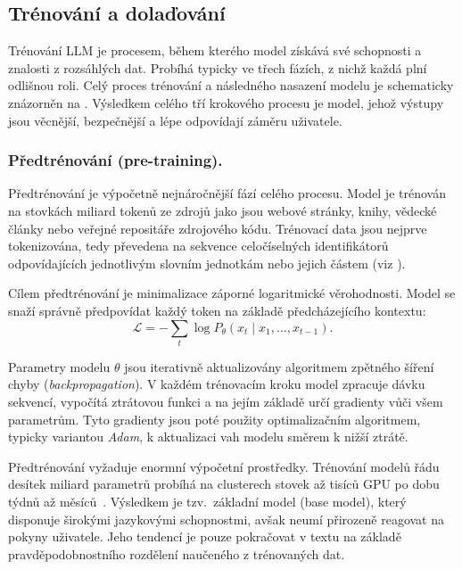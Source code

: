\subsection{Trénování a dolaďování}
\label{subsec:training-fine-tuning}

Trénování LLM je procesem, během kterého model získává své schopnosti a znalosti z rozsáhlých dat.
Probíhá typicky ve třech fázích, z nichž každá plní odlišnou roli.
Celý proces trénování a následného nasazení modelu je schematicky znázorněn na .
Výsledkem celého tří krokového procesu je model, jehož výstupy jsou věcnější, bezpečnější a lépe odpovídají záměru uživatele.

\subsubsection*{Předtrénování (pre-training).}
Předtrénování je výpočetně nejnáročnější fází celého procesu.
Model je trénován na stovkách miliard tokenů ze zdrojů jako jsou webové stránky, knihy, vědecké články nebo veřejné repositáře zdrojového kódu.
Trénovací data jsou nejprve tokenizována, tedy převedena na sekvence celočíselných identifikátorů odpovídajících jednotlivým slovním jednotkám nebo jejich částem (viz ).

Cílem předtrénování je minimalizace záporné logaritmické věrohodnosti.
Model se snaží správně předpovídat každý token na základě předcházejícího kontextu:
\begin{equation}
    \mathcal{L} = -\sum_{t} \log P_\theta(x_t \mid x_1, \ldots, x_{t-1}). \label{eq:training-loss}
\end{equation}

Parametry modelu $\theta$ jsou iterativně aktualizovány algoritmem zpětného šíření chyby (\textit{backpropagation}).
V každém trénovacím kroku model zpracuje dávku sekvencí, vypočítá ztrátovou funkci a na jejím základě určí gradienty vůči všem parametrům.
Tyto gradienty jsou poté použity optimalizačním algoritmem, typicky variantou \textit{Adam}, k aktualizaci vah modelu směrem k nižší ztrátě.

Předtrénování vyžaduje enormní výpočetní prostředky.
Trénování modelů řádu desítek miliard parametrů probíhá na clusterech stovek až tisíců GPU po dobu týdnů až měsíců~\cite{brown-gpt3}.
Výsledkem je tzv.\ základní model (base model), který disponuje širokými jazykovými schopnostmi, avšak neumí přirozeně reagovat na pokyny uživatele.
Jeho tendencí je pouze pokračovat v textu na základě pravděpodobnostního rozdělení naučeného z trénovaných dat.

